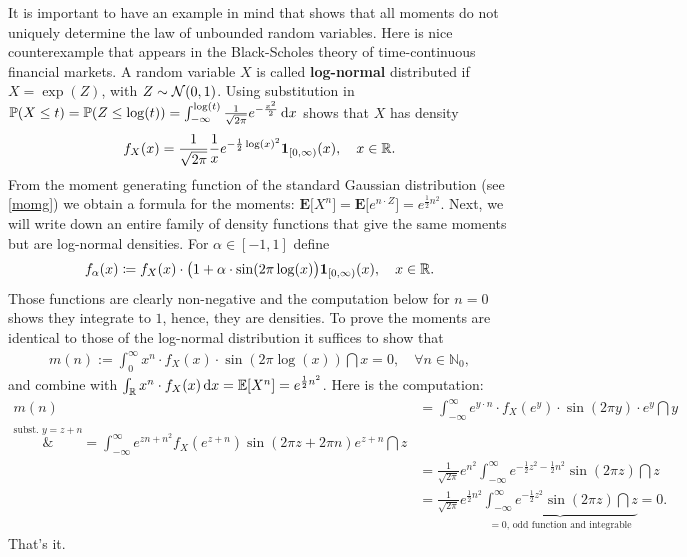 It is important to have an example in mind that shows that all moments do not uniquely determine the law of unbounded random variables. Here is nice counterexample that appears in the Black-Scholes theory of time-continuous financial markets. A random variable $X$ is called \textbf{log-normal} distributed if $X = \exp(Z)$, with $Z \sim \mathcal{N}(0,1)$. Using substitution in $\mathbb P(X\leq t)=\mathbb P(Z\leq \log(t))=\int_{-\infty}^{\log(t)} \frac{1}{\sqrt{2\pi}} e^{-\frac{x^2}{2}}\, \mathrm{d} x$ shows that $X$ has density $$ f_X(x) = \frac{1}{\sqrt{2 \pi}} \frac{1}{x} e^{- \frac{1}{2} \log(x)^2}\mathbf 1_{[0,\infty)}(x),\quad x\in\mathbb{R}.$$ From the moment generating function of the standard Gaussian distribution (see \ref{momg}) we obtain a formula for the moments: $\mathbf E\big[X^n \big] = \mathbf E \big[ e^{n\cdot Z} \big] = e^{\frac{1}{2}n^2}$. Next, we will write down an entire family of density functions that give the same moments but are log-normal densities. For $\alpha \in [-1,1]$ define
\begin{align*}
	f_{\alpha}(x) \coloneqq f_X(x) \cdot \big( 1 + \alpha \cdot \sin(2 \pi \log(x) \big)\mathbf 1_{[0,\infty)}(x),\quad x\in\mathbb{R}.
\end{align*}
Those functions are clearly non-negative and the computation below for $n=0$ shows they integrate to $1$, hence, they are densities. To prove the moments are identical to those of the log-normal distribution it suffices to show that 
\begin{align*}
	m(n) := \int_0^{\infty} x^n \cdot f_X(x) \cdot \sin(2 \pi \log(x)) \dint x = 0,\quad \forall n \in \mathbb{N}_0,
\end{align*}
and combine with $\int_{\mathbb{R}} x^n\cdot f_X(x)\, \mathrm{d} x=\mathbb{E}[X^n]=e^{\frac{1}{2}n^2}$. Here is the computation:
\begin{align*}
	m(n) &= \int_{-\infty}^{\infty} e^{y\cdot n} \cdot f_X( e^y) \cdot \sin(2 \pi y ) \cdot e^y \dint y \\
		\overset{\text{subst. }y=z+n}&{=} \int_{-\infty}^{\infty} e^{zn + n^2} f_X(e^{z+n}) \sin(2 \pi z + 2 \pi n) e^{z+n} \dint z \\
		&= \frac{1}{\sqrt{2\pi}} e^{n^2} \int_{-\infty}^{\infty} e^{-\frac{1}{2}z^2-\frac{1}{2}n^2} \sin(2 \pi z) \dint z \\
		&= \frac{1}{\sqrt{2 \pi}} e^{\frac{1}{2}n^2} \underbrace{\int_{-\infty}^{\infty} e^{-\frac{1}{2}z^2} \sin(2 \pi z ) \dint z}_{ = 0 \text{, odd function and integrable}}=0.
\end{align*}
That's it.\smallskip


